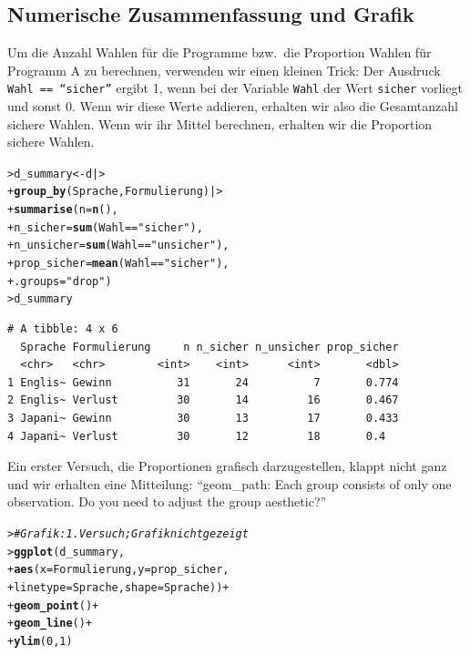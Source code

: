 \documentclass[oneside, 10pt]{book}\usepackage[]{graphicx}\usepackage[]{xcolor}
\makeatletter
\newcommand{\hlnum}[1]{\textcolor[rgb]{0.686,0.059,0.569}{#1}}%
\newcommand{\hlstr}[1]{\textcolor[rgb]{0.192,0.494,0.8}{#1}}%
\newcommand{\hlcom}[1]{\textcolor[rgb]{0.678,0.584,0.686}{\textit{#1}}}%
\newcommand{\hlopt}[1]{\textcolor[rgb]{0,0,0}{#1}}%
\newcommand{\hlstd}[1]{\textcolor[rgb]{0.345,0.345,0.345}{#1}}%
\newcommand{\hlkwb}[1]{\textcolor[rgb]{0.69,0.353,0.396}{#1}}%
\newcommand{\hlkwc}[1]{\textcolor[rgb]{0.333,0.667,0.333}{#1}}%
\newcommand{\hlkwd}[1]{\textcolor[rgb]{0.737,0.353,0.396}{\textbf{#1}}}%
\newenvironment{kframe}{%
 \def\at@end@of@kframe{}%
 \ifinner\ifhmode%
  \def\at@end@of@kframe{\end{minipage}}%
  \begin{minipage}{\columnwidth}%
 \fi\fi%
 \def\FrameCommand##1{\hskip\@totalleftmargin \hskip-\fboxsep
 \colorbox{shadecolor}{##1}\hskip-\fboxsep
     \hskip-\linewidth \hskip-\@totalleftmargin \hskip\columnwidth}%
 \MakeFramed {\advance\hsize-\width
   \@totalleftmargin\z@ \linewidth\hsize
   \@setminipage}}%
 {\par\unskip\endMakeFramed%
 \at@end@of@kframe}
\newenvironment{knitrout}{}{} %
\makeatother
\begin{document}
\subsection{Numerische Zusammenfassung und Grafik}
Um die Anzahl Wahlen für die Programme bzw.\ die Proportion Wahlen für Programm A zu berechnen,
verwenden wir einen kleinen Trick: Der Ausdruck
\texttt{Wahl == ``sicher''} ergibt 1, wenn bei der Variable
\texttt{Wahl} der Wert \texttt{sicher} vorliegt und sonst 0.
Wenn wir diese Werte addieren, erhalten wir also die Gesamtanzahl
sichere Wahlen. Wenn wir ihr Mittel berechnen, erhalten
wir die Proportion sichere Wahlen.
\begin{knitrout}
\color{fgcolor}\begin{kframe}
\begin{alltt}
\hlstd{> }\hlstd{d_summary} \hlkwb{<-} \hlstd{d |>}
\hlstd{+ }  \hlkwd{group_by}\hlstd{(Sprache, Formulierung) |>}
\hlstd{+ }  \hlkwd{summarise}\hlstd{(}\hlkwc{n} \hlstd{=} \hlkwd{n}\hlstd{(),}
\hlstd{+ }            \hlkwc{n_sicher} \hlstd{=} \hlkwd{sum}\hlstd{(Wahl} \hlopt{==} \hlstr{"sicher"}\hlstd{),}
\hlstd{+ }            \hlkwc{n_unsicher} \hlstd{=} \hlkwd{sum}\hlstd{(Wahl} \hlopt{==} \hlstr{"unsicher"}\hlstd{),}
\hlstd{+ }            \hlkwc{prop_sicher} \hlstd{=} \hlkwd{mean}\hlstd{(Wahl} \hlopt{==} \hlstr{"sicher"}\hlstd{),}
\hlstd{+ }            \hlkwc{.groups} \hlstd{=} \hlstr{"drop"}\hlstd{)}
\hlstd{> }\hlstd{d_summary}
\end{alltt}
\begin{verbatim}
# A tibble: 4 x 6
  Sprache Formulierung     n n_sicher n_unsicher prop_sicher
  <chr>   <chr>        <int>    <int>      <int>       <dbl>
1 Englis~ Gewinn          31       24          7       0.774
2 Englis~ Verlust         30       14         16       0.467
3 Japani~ Gewinn          30       13         17       0.433
4 Japani~ Verlust         30       12         18       0.4  
\end{verbatim}
\end{kframe}
\end{knitrout}

Ein erster Versuch, die Proportionen grafisch darzugestellen,
klappt nicht ganz und wir erhalten eine Mitteilung:
``geom\_path: Each group consists of only one observation. Do you need to adjust the
group aesthetic?''
\begin{knitrout}
\color{fgcolor}\begin{kframe}
\begin{alltt}
\hlstd{> }\hlcom{# Grafik: 1. Versuch; Grafik nicht gezeigt}
\hlstd{> }\hlkwd{ggplot}\hlstd{(d_summary,}
\hlstd{+ }       \hlkwd{aes}\hlstd{(}\hlkwc{x} \hlstd{= Formulierung,} \hlkwc{y} \hlstd{= prop_sicher,}
\hlstd{+ }           \hlkwc{linetype} \hlstd{= Sprache,} \hlkwc{shape} \hlstd{= Sprache))} \hlopt{+}
\hlstd{+ }  \hlkwd{geom_point}\hlstd{()} \hlopt{+}
\hlstd{+ }  \hlkwd{geom_line}\hlstd{()} \hlopt{+}
\hlstd{+ }  \hlkwd{ylim}\hlstd{(}\hlnum{0}\hlstd{,} \hlnum{1}\hlstd{)}
\end{alltt}
\end{kframe}
\end{knitrout}
\end{document}
